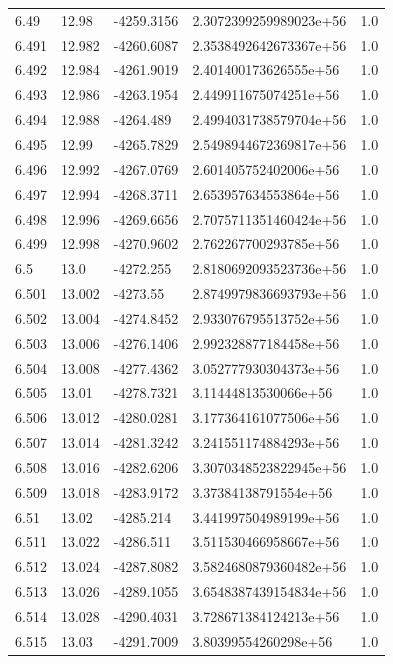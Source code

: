 \begin{tabular}{lllll}
6.49 & 12.98 & -4259.3156 & 2.3072399259989023e+56 & 1.0 \\
6.491 & 12.982 & -4260.6087 & 2.3538492642673367e+56 & 1.0 \\
6.492 & 12.984 & -4261.9019 & 2.401400173626555e+56 & 1.0 \\
6.493 & 12.986 & -4263.1954 & 2.449911675074251e+56 & 1.0 \\
6.494 & 12.988 & -4264.489 & 2.4994031738579704e+56 & 1.0 \\
6.495 & 12.99 & -4265.7829 & 2.5498944672369817e+56 & 1.0 \\
6.496 & 12.992 & -4267.0769 & 2.601405752402006e+56 & 1.0 \\
6.497 & 12.994 & -4268.3711 & 2.653957634553864e+56 & 1.0 \\
6.498 & 12.996 & -4269.6656 & 2.7075711351460424e+56 & 1.0 \\
6.499 & 12.998 & -4270.9602 & 2.762267700293785e+56 & 1.0 \\
6.5 & 13.0 & -4272.255 & 2.8180692093523736e+56 & 1.0 \\
6.501 & 13.002 & -4273.55 & 2.8749979836693793e+56 & 1.0 \\
6.502 & 13.004 & -4274.8452 & 2.933076795513752e+56 & 1.0 \\
6.503 & 13.006 & -4276.1406 & 2.992328877184458e+56 & 1.0 \\
6.504 & 13.008 & -4277.4362 & 3.052777930304373e+56 & 1.0 \\
6.505 & 13.01 & -4278.7321 & 3.11444813530066e+56 & 1.0 \\
6.506 & 13.012 & -4280.0281 & 3.177364161077506e+56 & 1.0 \\
6.507 & 13.014 & -4281.3242 & 3.241551174884293e+56 & 1.0 \\
6.508 & 13.016 & -4282.6206 & 3.3070348523822945e+56 & 1.0 \\
6.509 & 13.018 & -4283.9172 & 3.37384138791554e+56 & 1.0 \\
6.51 & 13.02 & -4285.214 & 3.441997504989199e+56 & 1.0 \\
6.511 & 13.022 & -4286.511 & 3.511530466958667e+56 & 1.0 \\
6.512 & 13.024 & -4287.8082 & 3.5824680879360482e+56 & 1.0 \\
6.513 & 13.026 & -4289.1055 & 3.6548387439154834e+56 & 1.0 \\
6.514 & 13.028 & -4290.4031 & 3.728671384124213e+56 & 1.0 \\
6.515 & 13.03 & -4291.7009 & 3.80399554260298e+56 & 1.0 \\

\end{tabular}
